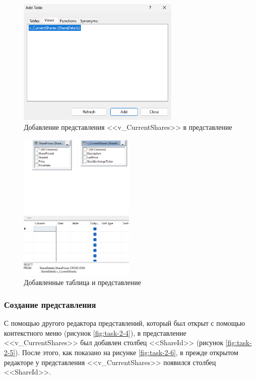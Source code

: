 \documentclass[a4paper, 14pt]{extarticle}
\begin{document}
\begin{figure}[H]
  \centering
  \includegraphics[width=0.7\textwidth]{images/task-2/2.png}
  \caption{
    Добавление представления <<\foreignlanguage{english}{v\_CurrentShares}>> в
    представление
  }
  \label{fig:task-2-2}
\end{figure}

\begin{figure}[H]
  \centering
  \includegraphics[width=0.5\textwidth]{images/task-2/3.png}
  \caption{Добавленные таблица и представление}
  \label{fig:task-2-3}
\end{figure}

\subsubsection{Создание представления}

С помощью другого редактора представлений, который был открыт с помощью
контекстного меню (рисунок \ref{fig:task-2-4}), в представление
<<\foreignlanguage{english}{v\_CurrentShares}>> был добавлен столбец
<<\foreignlanguage{english}{ShareId}>> (рисунок \ref{fig:task-2-5}). После
этого, как показано на рисунке \ref{fig:task-2-6}, в прежде открытом редакторе у
представления <<\foreignlanguage{english}{v\_CurrentShares}>> появился столбец
<<\foreignlanguage{english}{ShareId}>>.
\end{document}
